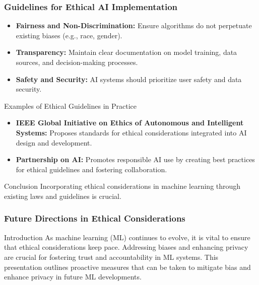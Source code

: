 \documentclass[aspectratio=169]{beamer}
\begin{document}
\begin{frame}[fragile]
    \frametitle{Guidelines for Ethical AI Implementation}
    \begin{itemize}
        \item \textbf{Fairness and Non-Discrimination:} 
        Ensure algorithms do not perpetuate existing biases (e.g., race, gender).
        \item \textbf{Transparency:} 
        Maintain clear documentation on model training, data sources, and decision-making processes.
        \item \textbf{Safety and Security:} 
        AI systems should prioritize user safety and data security.
    \end{itemize}
    
    \begin{block}{Examples of Ethical Guidelines in Practice}
        \begin{itemize}
            \item \textbf{IEEE Global Initiative on Ethics of Autonomous and Intelligent Systems:} Proposes standards for ethical considerations integrated into AI design and development.
            \item \textbf{Partnership on AI:} Promotes responsible AI use by creating best practices for ethical guidelines and fostering collaboration.
        \end{itemize}
    \end{block}
    
    \begin{block}{Conclusion}
        Incorporating ethical considerations in machine learning through existing laws and guidelines is crucial.
    \end{block}
\end{frame}

\begin{frame}[fragile]
    \frametitle{Future Directions in Ethical Considerations}
    \begin{block}{Introduction}
        As machine learning (ML) continues to evolve, it is vital to ensure that ethical considerations keep pace. Addressing biases and enhancing privacy are crucial for fostering trust and accountability in ML systems. This presentation outlines proactive measures that can be taken to mitigate bias and enhance privacy in future ML developments.
    \end{block}
\end{frame}
\end{document}
